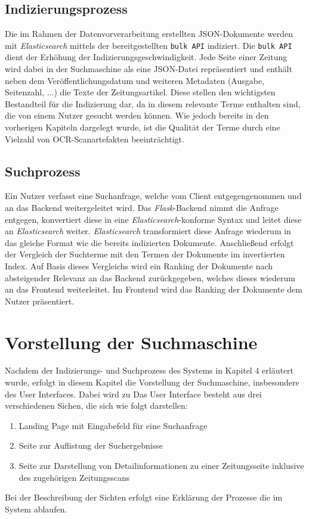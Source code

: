 \documentclass[11pt,a4paper, halfparskip]{scrartcl}
\begin{document}
\subsection{Indizierungsprozess}

Die im Rahmen der Datenvorverarbeitung erstellten JSON-Dokumente werden mit \textit{Elasticsearch} mittels der bereitgestellten \texttt{bulk API} indiziert.
Die \texttt{bulk API} dient der Erhöhung der Indizierungsgeschwindigkeit.
Jede Seite einer Zeitung wird dabei in der Suchmaschine als eine JSON-Datei repräsentiert und enthält neben dem Veröffentlichungsdatum und weiteren Metadaten (Ausgabe, Seitenzahl, ...) die Texte der Zeitungsartikel.
Diese stellen den wichtigsten Bestandteil für die Indizierung dar, da in diesem relevante Terme enthalten sind, die von einem Nutzer gesucht werden können.
Wie jedoch bereits in den vorherigen Kapiteln dargelegt wurde, ist die Qualität der Terme durch eine Vielzahl von OCR-Scanartefakten beeinträchtigt.

\subsection{Suchprozess}

Ein Nutzer verfasst eine Suchanfrage, welche vom Client entgegengenommen und an das Backend weitergeleitet wird.
Das \textit{Flask}-Backend nimmt die Anfrage entgegen, konvertiert diese in eine \textit{Elasticsearch}-konforme Syntax und leitet diese an \textit{Elasticsearch} weiter.
\textit{Elasticsearch} transformiert diese Anfrage wiederum in das gleiche Format wie die bereits indizierten Dokumente.
Anschließend erfolgt der Vergleich der Suchterme mit den Termen der Dokumente im invertierten Index.
Auf Basis dieses Vergleichs wird ein Ranking der Dokumente nach absteigender Relevanz an das Backend zurückgegeben, welches dieses wiederum an das Frontend weiterleitet.
Im Frontend wird das Ranking der Dokumente dem Nutzer präsentiert.

\section{Vorstellung der Suchmaschine}

Nachdem der Indizierungs- und Suchprozess des Systems in Kapitel 4 erläutert wurde, erfolgt in diesem Kapitel die Vorstellung der Suchmaschine, insbesondere des User Interfaces.
Dabei wird zu 
Das User Interface besteht aus drei verschiedenen Sichen, die sich wie folgt darstellen:
	\begin{enumerate}
		\item Landing Page mit Eingabefeld für eine Suchanfrage
		\item Seite zur Auflistung der Suchergebnisse
		\item Seite zur Darstellung von Detailinformationen zu einer Zeitungsseite inklusive des zugehörigen Zeitungsscans  	
	\end{enumerate}
Bei der Beschreibung der Sichten erfolgt eine Erklärung der Prozesse die im System ablaufen.
\end{document}
